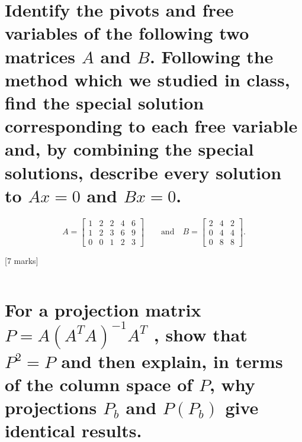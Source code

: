 \documentclass[11pt]{article}
\makeatletter
\newcommand{\boxspacing}{\kern\kvtcb@left@rule\kern\kvtcb@boxsep}
\newcommand{\prompt}[4]{
        {\ttfamily\llap{{\color{#2}[#3]:\hspace{3pt}#4}}\vspace{-\baselineskip}}
    }
\makeatother
\begin{document}
    \section{\texorpdfstring{Identify the pivots and free variables of the
following two matrices \(A\) and \(B\). Following the method which we
studied in class, find the special solution corresponding to each free
variable and, by combining the special solutions, describe every
solution to \(Ax=0\) and
\(Bx=0\).}{Identify the pivots and free variables of the following two matrices A and B. Following the method which we studied in class, find the special solution corresponding to each free variable and, by combining the special solutions, describe every solution to Ax=0 and Bx=0.}}\label{identify-the-pivots-and-free-variables-of-the-following-two-matrices-a-and-b.-following-the-method-which-we-studied-in-class-find-the-special-solution-corresponding-to-each-free-variable-and-by-combining-the-special-solutions-describe-every-solution-to-ax0-and-bx0.}

\[
A = 
\begin{bmatrix}
1 & 2 & 2 & 4 & 6 \\
1 & 2 & 3 & 6 & 9 \\
0 & 0 & 1 & 2 & 3
\end{bmatrix} \qquad \text{and} \quad
B = 
\begin{bmatrix}
2 & 4 & 2 \\
0 & 4 & 4 \\
0 & 8 & 8
\end{bmatrix}.
\]

{[}7 marks{]}

    \begin{tcolorbox}[breakable, size=fbox, boxrule=1pt, pad at break*=1mm,colback=cellbackground, colframe=cellborder]
\prompt{In}{incolor}{ }{\boxspacing}
\begin{Verbatim}[commandchars=\\\{\}]

\end{Verbatim}
\end{tcolorbox}

    \section{\texorpdfstring{For a projection matrix
\(P = A(A^T A)^{-1} A^T\) , show that \(P^2 = P\) and then explain, in
terms of the column space of \(P\), why projections \(P_b\) and
\(P(P_b)\) give identical
results.}{For a projection matrix P = A(A\^{}T A)\^{}\{-1\} A\^{}T , show that P\^{}2 = P and then explain, in terms of the column space of P, why projections P\_b and P(P\_b) give identical results.}}\label{for-a-projection-matrix-p-aat-a-1-at-show-that-p2-p-and-then-explain-in-terms-of-the-column-space-of-p-why-projections-p_b-and-pp_b-give-identical-results.}
\end{document}
